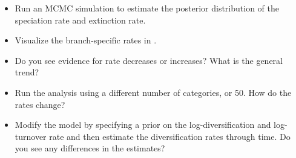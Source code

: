 \begin{itemize}
\item Run an MCMC simulation to estimate the posterior distribution of the speciation rate and extinction rate.
\item Visualize the branch-specific rates in \FigTree.
\item Do you see evidence for rate decreases or increases? What is the general trend?
\item Run the analysis using a different number of categories,  or 50. How do the rates change?
\item Modify the model by specifying a prior on the log-diversification and log-turnover rate and then estimate the diversification rates through time. Do you see any differences in the estimates? 
\end{itemize}






